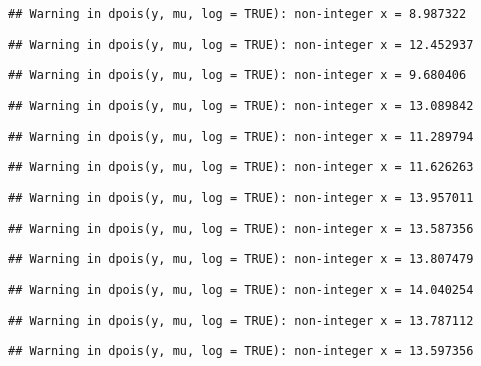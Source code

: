 \documentclass[
]{article}
\begin{document}
\begin{verbatim}
## Warning in dpois(y, mu, log = TRUE): non-integer x = 8.987322
\end{verbatim}

\begin{verbatim}
## Warning in dpois(y, mu, log = TRUE): non-integer x = 12.452937
\end{verbatim}

\begin{verbatim}
## Warning in dpois(y, mu, log = TRUE): non-integer x = 9.680406
\end{verbatim}

\begin{verbatim}
## Warning in dpois(y, mu, log = TRUE): non-integer x = 13.089842
\end{verbatim}

\begin{verbatim}
## Warning in dpois(y, mu, log = TRUE): non-integer x = 11.289794
\end{verbatim}

\begin{verbatim}
## Warning in dpois(y, mu, log = TRUE): non-integer x = 11.626263
\end{verbatim}

\begin{verbatim}
## Warning in dpois(y, mu, log = TRUE): non-integer x = 13.957011
\end{verbatim}

\begin{verbatim}
## Warning in dpois(y, mu, log = TRUE): non-integer x = 13.587356
\end{verbatim}

\begin{verbatim}
## Warning in dpois(y, mu, log = TRUE): non-integer x = 13.807479
\end{verbatim}

\begin{verbatim}
## Warning in dpois(y, mu, log = TRUE): non-integer x = 14.040254
\end{verbatim}

\begin{verbatim}
## Warning in dpois(y, mu, log = TRUE): non-integer x = 13.787112
\end{verbatim}

\begin{verbatim}
## Warning in dpois(y, mu, log = TRUE): non-integer x = 13.597356
\end{verbatim}
\end{document}
